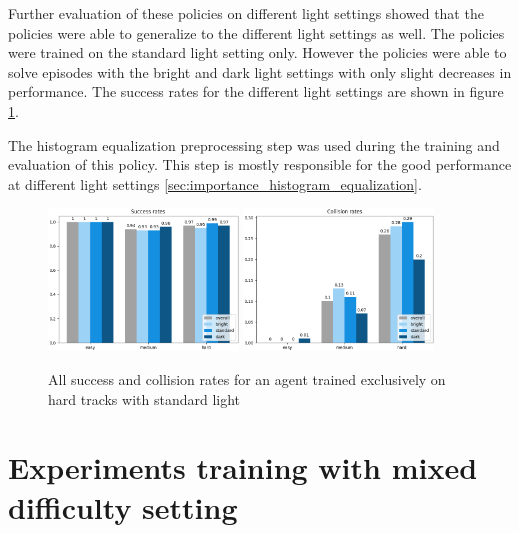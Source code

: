 Further evaluation of these policies on different light settings showed that the policies were able to generalize to the different light settings as well. The policies were trained on the standard light setting only. However the policies were able to solve episodes with the bright and dark light settings with only slight decreases in performance. The success rates for the different light settings are shown in figure \ref{fig:hardDistance_generalization_light_settings}.

The histogram equalization preprocessing step was used during the training and evaluation of this policy. This step is mostly responsible for the good performance at different light settings \ref{sec:importance_histogram_equalization}.

\begin{figure}
    \centering
    \includegraphics[width=0.45\textwidth]{Bilder/notebook_images/hardDistanceStandardLight_eval_all_success_rates_barplot.png}
    \includegraphics[width=0.45\textwidth]{Bilder/notebook_images/hardDistanceStandardLight_eval_all_collision_rates_barplot.png}
    \caption{All success and collision rates for an agent trained exclusively on hard tracks with standard light}
    \label{fig:hardDistance_generalization_light_settings}
\end{figure}

\section{Experiments training with mixed difficulty setting}
\label{cha:experiment_mixed_difficulty}

